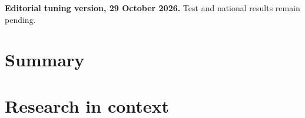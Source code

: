 \documentclass[11pt]{article}
\begin{document}
\pagestyle{plain}
\begin{center}\sffamily\bfseries\LARGE\editiontitle\end{center}
\noindent\par\vspace{10pt}
\noindent\textbf{Editorial tuning version, 29 October 2026.}
Test and national results remain pending.\par
\section*{Summary}
\clearpage\section*{Research in context}
\clearpage{}
\clearpage


\end{document}
